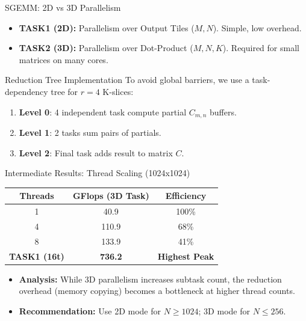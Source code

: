 \documentclass[aspectratio=169]{beamer}
\begin{document}
\begin{frame}{SGEMM: 2D vs 3D Parallelism}
  \begin{itemize}
    \item \textbf{TASK1 (2D):} Parallelism over Output Tiles ($M, N$). Simple, low overhead.
    \item \textbf{TASK2 (3D):} Parallelism over Dot-Product ($M, N, K$). Required for small matrices on many cores.
  \end{itemize}
  \begin{block}{Reduction Tree Implementation}
    To avoid global barriers, we use a task-dependency tree for $r=4$ K-slices:
    \begin{enumerate}
      \item \textbf{Level 0}: 4 independent task compute partial $C_{m,n}$ buffers.
      \item \textbf{Level 1}: 2 tasks sum pairs of partials.
      \item \textbf{Level 2}: Final task adds result to matrix $C$.
    \end{enumerate}
  \end{block}
\end{frame}

\begin{frame}{Intermediate Results: Thread Scaling (1024x1024)}
  \begin{center}
    \begin{tabular}{|c|c|c|}
      \hline
      \textbf{Threads} & \textbf{GFlops (3D Task)} & \textbf{Efficiency} \\
      \hline
      1  & 40.9 & 100\% \\
      4  & 110.9 & 68\% \\
      8  & 133.9 & 41\% \\
      \hline
      \textbf{TASK1 (16t)} & \textbf{736.2} & \textbf{Highest Peak} \\
      \hline
    \end{tabular}
  \end{center}
  \begin{itemize}
    \item \textbf{Analysis:} While 3D parallelism increases subtask count, the reduction overhead (memory copying) becomes a bottleneck at higher thread counts. 
    \item \textbf{Recommendation:} Use 2D mode for $N \ge 1024$; 3D mode for $N \le 256$.
  \end{itemize}
\end{frame}
\end{document}
